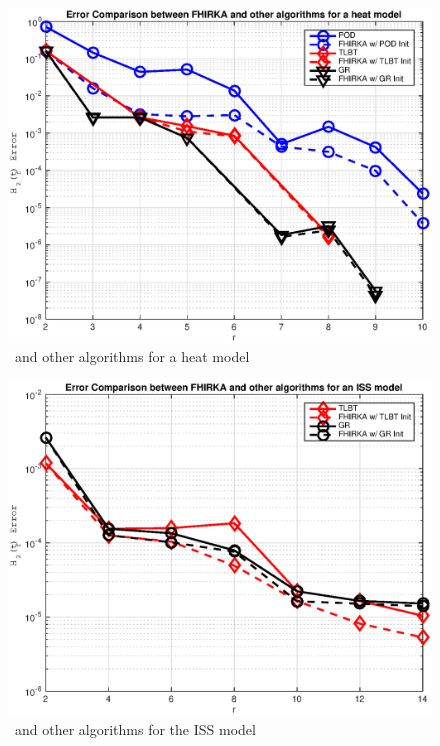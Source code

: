 \documentclass[twocolumn]{autart}
\begin{document}
 
  \begin{figure}[H] 
 \centering
 \includegraphics [scale=0.4]{allDataHeatF} 
 \caption{\FH \ and other algorithms for a heat model\label{fig:hm}}
 \end{figure}
 \begin{figure}[H]
 \centering
  \includegraphics [scale=0.4]{ErrorVSrISSF}
 \caption{\FH \ and other algorithms for the ISS model \label{fig:iss}}
 \end{figure}
\end{document}
